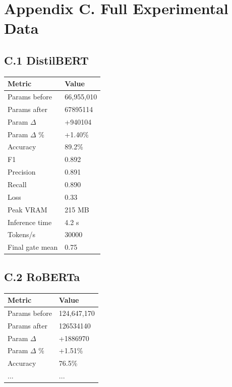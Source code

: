 
\section{Appendix C. Full Experimental Data}

\subsection{C.1 DistilBERT}

\begin{table}[H]
\centering
\small
\begin{tabular}{ll}
\toprule
\textbf{Metric} & \textbf{Value} \\
\midrule
Params before & 66,955,010 \\
Params after & 67895114 \\
Param $\Delta$ & +940104 \\
Param $\Delta$ \% & +1.40\% \\
Accuracy & 89.2\% \\
F1 & 0.892 \\
Precision & 0.891 \\
Recall & 0.890 \\
Loss & 0.33 \\
Peak VRAM & 215 MB \\
Inference time & 4.2 s \\
Tokens/s & 30000 \\
Final gate mean & 0.75 \\
\bottomrule
\end{tabular}
\end{table}

\subsection{C.2 RoBERTa}

\begin{table}[H]
\centering
\small
\begin{tabular}{ll}
\toprule
\textbf{Metric} & \textbf{Value} \\
\midrule
Params before & 124,647,170 \\
Params after & 126534140 \\
Param $\Delta$ & +1886970 \\
Param $\Delta$ \% & +1.51\% \\
Accuracy & 76.5\% \\
... & ... \\
\bottomrule
\end{tabular}
\end{table}

